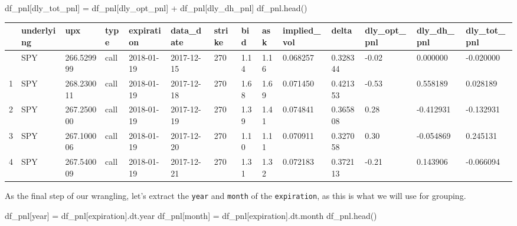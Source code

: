 \documentclass[
  letterpaper,
  DIV=11,
  numbers=noendperiod]{scrreprt}
\newenvironment{Shaded}{\begin{snugshade}}{\end{snugshade}}
\newcommand{\NormalTok}[1]{\textcolor[rgb]{0.00,0.23,0.31}{#1}}
\newcommand{\OperatorTok}[1]{\textcolor[rgb]{0.37,0.37,0.37}{#1}}
\newcommand{\StringTok}[1]{\textcolor[rgb]{0.13,0.47,0.30}{#1}}
\begin{document}
\begin{Shaded}
\begin{Highlighting}[]
\NormalTok{df\_pnl[}\StringTok{\textquotesingle{}dly\_tot\_pnl\textquotesingle{}}\NormalTok{] }\OperatorTok{=}\NormalTok{ df\_pnl[}\StringTok{\textquotesingle{}dly\_opt\_pnl\textquotesingle{}}\NormalTok{] }\OperatorTok{+}\NormalTok{ df\_pnl[}\StringTok{\textquotesingle{}dly\_dh\_pnl\textquotesingle{}}\NormalTok{]}
\NormalTok{df\_pnl.head()}
\end{Highlighting}
\end{Shaded}

\begin{longtable}[]{@{}llllllllllllll@{}}
\toprule\noalign{}
& underlying & upx & type & expiration & data\_date & strike & bid & ask
& implied\_vol & delta & dly\_opt\_pnl & dly\_dh\_pnl & dly\_tot\_pnl \\
\midrule\noalign{}
\endhead
\bottomrule\noalign{}
\endlastfoot
0 & SPY & 266.529999 & call & 2018-01-19 & 2017-12-15 & 270 & 1.14 &
1.16 & 0.068257 & 0.328344 & -0.02 & 0.000000 & -0.020000 \\
1 & SPY & 268.230011 & call & 2018-01-19 & 2017-12-18 & 270 & 1.68 &
1.69 & 0.071450 & 0.421353 & -0.53 & 0.558189 & 0.028189 \\
2 & SPY & 267.250000 & call & 2018-01-19 & 2017-12-19 & 270 & 1.39 &
1.41 & 0.074841 & 0.365808 & 0.28 & -0.412931 & -0.132931 \\
3 & SPY & 267.100006 & call & 2018-01-19 & 2017-12-20 & 270 & 1.10 &
1.11 & 0.070911 & 0.327058 & 0.30 & -0.054869 & 0.245131 \\
4 & SPY & 267.540009 & call & 2018-01-19 & 2017-12-21 & 270 & 1.31 &
1.32 & 0.072183 & 0.372113 & -0.21 & 0.143906 & -0.066094 \\
\end{longtable}

As the final step of our wrangling, let's extract the \texttt{year} and
\texttt{month} of the \texttt{expiration}, as this is what we will use
for grouping.

\begin{Shaded}
\begin{Highlighting}[]
\NormalTok{df\_pnl[}\StringTok{\textquotesingle{}year\textquotesingle{}}\NormalTok{] }\OperatorTok{=}\NormalTok{ df\_pnl[}\StringTok{\textquotesingle{}expiration\textquotesingle{}}\NormalTok{].dt.year}
\NormalTok{df\_pnl[}\StringTok{\textquotesingle{}month\textquotesingle{}}\NormalTok{] }\OperatorTok{=}\NormalTok{ df\_pnl[}\StringTok{\textquotesingle{}expiration\textquotesingle{}}\NormalTok{].dt.month}
\NormalTok{df\_pnl.head()}
\end{Highlighting}
\end{Shaded}
\end{document}
